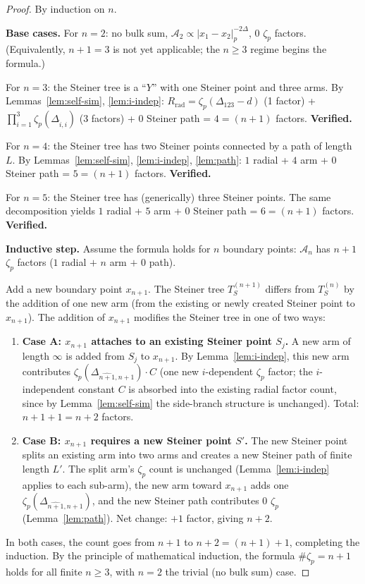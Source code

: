 \documentclass[11pt,a4paper]{article}
\newcommand{\normp}[1]{|#1|_p}
\begin{document}
\begin{proof}
By induction on $n$.

\textbf{Base cases.} For $n = 2$: no bulk sum, $\mathcal{A}_2 \propto \normp{x_1 - x_2}^{-2\Delta}$, $0$ $\zeta_p$ factors. (Equivalently, $n{+}1 = 3$ is not yet applicable; the $n \geq 3$ regime begins the formula.)

For $n = 3$: the Steiner tree is a ``$Y$'' with one Steiner point and three arms. By Lemmas~\ref{lem:self-sim}, \ref{lem:i-indep}: $R_{\mathrm{rad}} = \zeta_p(\Delta_{123} - d)$ (1 factor) + $\prod_{i=1}^3 \zeta_p(\Delta_{\hat{i},i})$ (3 factors) + $0$ Steiner path = $4 = (n{+}1)$ factors. \textbf{Verified.}

For $n = 4$: the Steiner tree has two Steiner points connected by a path of length $L$. By Lemmas~\ref{lem:self-sim}, \ref{lem:i-indep}, \ref{lem:path}: $1$ radial + $4$ arm + $0$ Steiner path = $5 = (n{+}1)$ factors. \textbf{Verified.}

For $n = 5$: the Steiner tree has (generically) three Steiner points. The same decomposition yields $1$ radial + $5$ arm + $0$ Steiner path = $6 = (n{+}1)$ factors. \textbf{Verified.}

\textbf{Inductive step.} Assume the formula holds for $n$ boundary points: $\mathcal{A}_n$ has $n{+}1$ $\zeta_p$ factors ($1$ radial $+$ $n$ arm $+$ $0$ path).

Add a new boundary point $x_{n+1}$. The Steiner tree $T_S^{(n+1)}$ differs from $T_S^{(n)}$ by the addition of one new arm (from the existing or newly created Steiner point to $x_{n+1}$). The addition of $x_{n+1}$ modifies the Steiner tree in one of two ways:
\begin{enumerate}[leftmargin=2em]
    \item \textbf{Case A: $x_{n+1}$ attaches to an existing Steiner point $S_j$.} A new arm of length $\infty$ is added from $S_j$ to $x_{n+1}$. By Lemma~\ref{lem:i-indep}, this new arm contributes $\zeta_p(\Delta_{\widehat{n+1}, n+1}) \cdot C$ (one new $i$-dependent $\zeta_p$ factor; the $i$-independent constant $C$ is absorbed into the existing radial factor count, since by Lemma~\ref{lem:self-sim} the side-branch structure is unchanged). Total: $n{+}1 + 1 = n{+}2$ factors.
    \item \textbf{Case B: $x_{n+1}$ requires a new Steiner point $S'$.} The new Steiner point splits an existing arm into two arms and creates a new Steiner path of finite length $L'$. The split arm's $\zeta_p$ count is unchanged (Lemma~\ref{lem:i-indep} applies to each sub-arm), the new arm toward $x_{n+1}$ adds one $\zeta_p(\Delta_{\widehat{n+1}, n+1})$, and the new Steiner path contributes $0$ $\zeta_p$ (Lemma~\ref{lem:path}). Net change: $+1$ factor, giving $n{+}2$.
\end{enumerate}

In both cases, the count goes from $n{+}1$ to $n{+}2 = (n{+}1){+}1$, completing the induction. By the principle of mathematical induction, the formula $\#\zeta_p = n{+}1$ holds for all finite $n \geq 3$, with $n = 2$ the trivial (no bulk sum) case. \qedhere
\end{proof}
\end{document}
